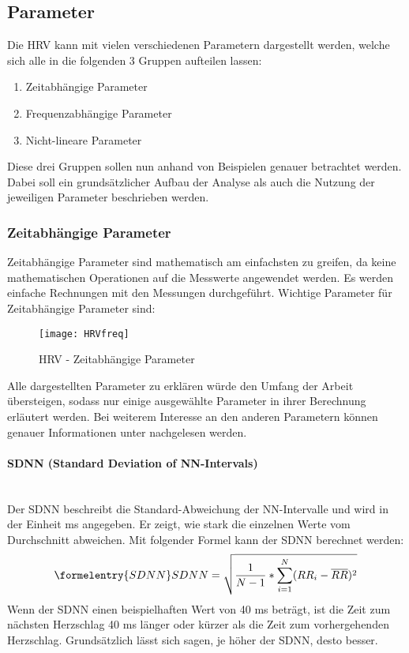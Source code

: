  \subsection{Parameter}
 
 Die HRV kann mit vielen verschiedenen Parametern dargestellt werden, welche sich alle in die folgenden 3 Gruppen aufteilen lassen:
 
 \begin{enumerate}
 	\item Zeitabhängige Parameter
 	\item Frequenzabhängige Parameter
 	\item Nicht-lineare Parameter
\end{enumerate}

Diese drei Gruppen sollen nun anhand von Beispielen genauer betrachtet werden. Dabei soll ein grundsätzlicher Aufbau der Analyse als auch die Nutzung der jeweiligen Parameter beschrieben werden.

\subsubsection{Zeitabhängige Parameter}	
Zeitabhängige Parameter sind mathematisch am einfachsten zu greifen, da keine mathematischen Operationen auf die Messwerte angewendet werden. Es werden einfache Rechnungen mit den Messungen durchgeführt. Wichtige Parameter für Zeitabhängige Parameter sind:   
 
 \begin{figure}[H]
 	\centering
 	\texttt{[image: HRVfreq]}
 	\caption{HRV - Zeitabhängige Parameter}
 	\label{fig:HRVfreq}
 	\cite[S.2]{med}
 \end{figure}
Alle dargestellten Parameter zu erklären würde den Umfang der Arbeit übersteigen, sodass nur einige ausgewählte Parameter in ihrer Berechnung erläutert werden. Bei weiterem Interesse an den anderen Parametern können genauer Informationen unter \cite{med} nachgelesen werden. 

\paragraph{SDNN (Standard Deviation of NN-Intervals)}\mbox{} \\
Der SDNN beschreibt die Standard-Abweichung der NN-Intervalle und wird in der Einheit ms angegeben. Er zeigt, wie stark die einzelnen Werte vom Durchschnitt abweichen. Mit folgender Formel kann der SDNN berechnet werden: 
\begin{equation}\formelentry{SDNN}
SDNN = \sqrt{\dfrac{1}{N-1} * \sum\limits_{i=1}^{N}  (RR_i - \overline{RR})^{2}}
\end{equation}
Wenn der SDNN einen beispielhaften Wert von 40 ms beträgt, ist die Zeit zum nächsten Herzschlag 40 ms länger oder kürzer als die Zeit zum vorhergehenden Herzschlag. Grundsätzlich lässt sich sagen, je höher der SDNN, desto besser.\\

